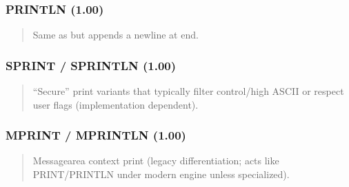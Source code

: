 \documentclass[letterpaper,10pt,english]{sphinxmanual}
\begin{document}
\subsubsection{PRINTLN (1.00)}
\label{\detokenize{ppl:println-1-00}}\begin{quote}

\sphinxAtStartPar
{}
\begin{description}
\sphinxAtStartPar
Same as  but appends a newline at end.

\begin{sphinxVerbatim}[commandchars=\\\{\}]
  
\end{sphinxVerbatim}

\end{description}
\end{quote}


\subsubsection{SPRINT / SPRINTLN (1.00)}
\label{\detokenize{ppl:sprint-sprintln-1-00}}\begin{quote}

\sphinxAtStartPar
{}
\begin{description}
\sphinxAtStartPar
“Secure” print variants that typically filter control/high ASCII or respect user flags (implementation dependent).

\end{description}
\end{quote}


\subsubsection{MPRINT / MPRINTLN (1.00)}
\label{\detokenize{ppl:mprint-mprintln-1-00}}\begin{quote}

\sphinxAtStartPar
{}
\begin{description}
\sphinxAtStartPar
Message\sphinxhyphen{}area context print (legacy differentiation; acts like PRINT/PRINTLN under modern engine unless specialized).

\end{description}
\end{quote}
\end{document}
